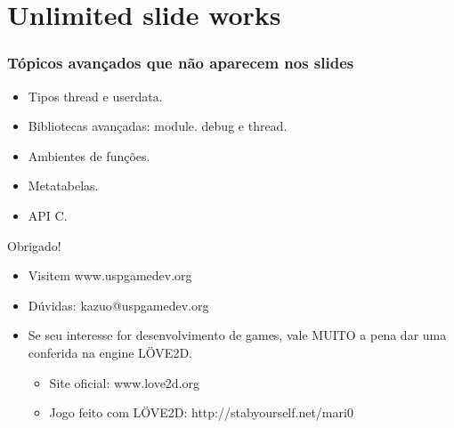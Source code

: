 \documentclass[brazil]{beamer}
\begin{document}
\section{Unlimited slide works}
\begin{frame}
  \frametitle{Tópicos avançados que não aparecem nos slides}
  \begin{itemize}
    \item Tipos thread e userdata.
    \item Bibliotecas avançadas: module. debug e thread.
    \item Ambientes de funções.
    \item Metatabelas.
    \item API C.
  \end{itemize}
\end{frame}
\begin{frame}
  \begin{center}
    \LARGE Obrigado!
  \end{center}
  \begin{itemize}
    \item Visitem www.uspgamedev.org
    \item Dúvidas: kazuo@uspgamedev.org
    \item Se seu interesse for desenvolvimento de games,
          vale MUITO a pena dar uma conferida na engine
          LÖVE2D.
    \begin{itemize}
      \item Site oficial: www.love2d.org
      \item Jogo feito com LÖVE2D: http://stabyourself.net/mari0
    \end{itemize}
  \end{itemize}
\end{frame}
\end{document}
